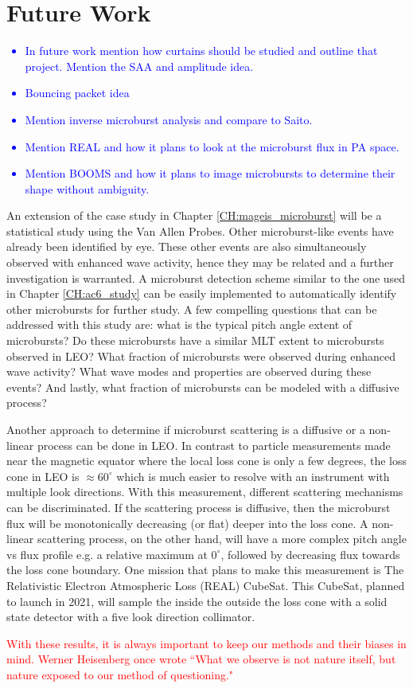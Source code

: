 \section{Future Work}
\textcolor{blue}{
\begin{itemize}
\item In future work mention how curtains should be studied and outline that project. Mention the SAA and amplitude idea.
\item Bouncing packet idea
\item Mention inverse microburst analysis and compare to Saito.
\item Mention REAL and how it plans to look at the microburst flux in PA space.
\item Mention BOOMS and how it plans to image microbursts to determine their shape without ambiguity. 
\end{itemize}
}

An extension of the case study in Chapter \ref{CH:mageis_microburst} will be a statistical study using the Van Allen Probes. Other microburst-like events have already been identified by eye. These other events are also simultaneously observed with enhanced wave activity, hence they may be related and a further investigation is warranted. A microburst detection scheme similar to the one used in Chapter \ref{CH:ac6_study} can be easily implemented to automatically identify other microbursts for further study. A few compelling questions that can be addressed with this study are: what is the typical pitch angle extent of microbursts? Do these microbursts have a similar MLT extent to microbursts observed in LEO? What fraction of microbursts were observed during enhanced wave activity? What wave modes and properties are observed during these events? And lastly, what fraction of microbursts can be modeled with a diffusive process?

Another approach to determine if microburst scattering is a diffusive or a non-linear process can be done in LEO. In contrast to particle measurements made near the magnetic equator where the local loss cone is only a few degrees, the loss cone in LEO is $\approx 60^\circ$ which is much easier to resolve with an instrument with multiple look directions. With this measurement, different scattering mechanisms can be discriminated. If the scattering process is diffusive, then the microburst flux will be monotonically decreasing (or flat) deeper into the loss cone. A non-linear scattering process, on the other hand, will have a more complex pitch angle vs flux profile e.g. a relative maximum at $0^\circ$, followed by decreasing flux towards the loss cone boundary. One mission that plans to make this measurement is The Relativistic Electron Atmospheric Loss (REAL) CubeSat. This CubeSat, planned to launch in 2021, will sample the inside the outside the loss cone with a solid state detector with a five look direction collimator.



\textcolor{red}{With these results, it is always important to keep our methods and their biases in mind. Werner Heisenberg once wrote ``What we observe is not nature itself, but nature exposed to our method of questioning." \citet{Heisenberg1958}}